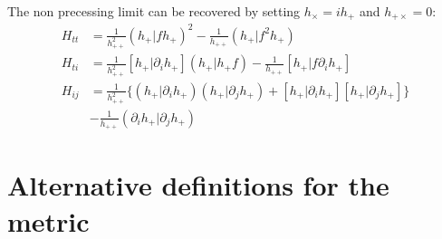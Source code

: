 \documentclass[twocolumn,showpacs,preprintnumbers,nofootinbib,prd,
superscriptaddress,10pt]{revtex4-2}
\newcommand{\rescalar}[2]{( #1 |#2 )}
\newcommand{\imscalar}[2]{[ #1|#2 ]}
\begin{document}
The non precessing limit can be recovered by setting $h_\times = i h_+$ and $h_{+\times} = 0$:
\begin{align}
	H_{tt} &= \frac{1}{h_{++}^{2}} \rescalar{{h_+}}{f{h_+}}^2 - \frac{1}{h_{++}} \rescalar{h_+}{f^2 {h_+}} \label{eq:H_tt_grad_NP} \\
	H_{ti} &= \frac{1}{h_{++}^{2}} \imscalar{h_+}{\partial_i {h_+}} \rescalar{{h_+}}{{h_+}f}
		- \frac{1}{h_{++}} \imscalar{h_+}{f \partial_i{h_+}} \label{eq:H_ti_grad_NP} \\
	H_{ij} &=  \frac{1}{h_{++}^{2}} \Big\{ \rescalar{h_+}{\partial_i {h_+}} \rescalar{{h_+}}{\partial_j {h_+}} +\imscalar{h_+}{\partial_i {h_+}} \imscalar{h_+}{\partial_j {h_+}} \Big\} \nonumber \\
	&- \frac{1}{h_{++}} \rescalar{\partial_i h_+}{\partial_j {h_+}} \label{eq:H_ij_grad_NP} 
\end{align}

\section{Alternative definitions for the metric}\label{app:metric_definition}

\blindtext
\blindtext
\blindtext

	
	
\end{document}
